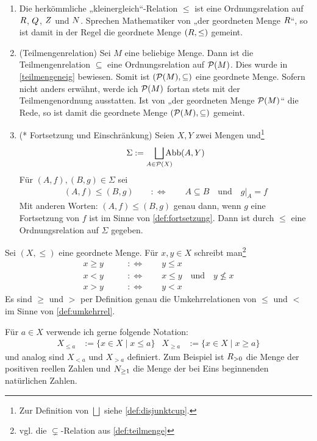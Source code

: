 \begin{bsp} \quad
    \begin{enumerate}
        \item Die herkömmliche „kleinergleich“-Relation $\le$ ist eine Ordnungsrelation auf $\relax R$, $\relax Q$, $\relax Z$ und $\relax N$. Sprechen Mathematiker von „der geordneten Menge $\relax R$“, so ist damit in der Regel die geordnete Menge $(\relax R,\le)$ gemeint.
        \item(Teilmengenrelation) Sei $M$ eine beliebige Menge. Dann ist die Teilmengenrelation $\subseteq$ eine Ordnungsrelation auf $\mathcal P(M)$. Dies wurde in \cref{teilmengeneig} bewiesen. Somit ist $(\mathcal P(M),\subseteq)$ eine geordnete Menge. Sofern nicht anders erwähnt, werde ich $\mathcal P(M)$ fortan stets mit der Teilmengenordnung ausstatten. Ist von „der geordneten Menge $\mathcal P(M)$“ die Rede, so ist damit die geordnete Menge $(\mathcal P(M),\subseteq)$ gemeint.
        \item(* Fortsetzung und Einschränkung) Seien $X,Y$ zwei Mengen und\footnote{Zur Definition von $\bigsqcup$ siehe \cref{def:disjunktcup}.}
            \[ \Sigma := \smashoperator[r]{\bigsqcup_{A\in \calP(X)}} \Abb(A,Y) \]
        Für $(A,f),(B,g)\in\Sigma$ sei
        \begin{align*}
            (A,f) \le (B,g) \qquad:\Leftrightarrow\qquad A\subseteq B\quad \text{und}\quad g\vert_A=f
        \end{align*}
        Mit anderen Worten: $(A,f)\le (B,g)$ genau dann, wenn $g$ eine Fortsetzung von $f$ ist im Sinne von \cref{def:fortsetzung}. Dann ist durch $\le$ eine Ordnungsrelation auf $\Sigma$ gegeben.
    \end{enumerate}
\end{bsp}


\begin{nota} \label{striktkleiner}
    Sei $(X,\le)$ eine geordnete Menge. Für $x,y\in X$ schreibt man\footnote{vgl. die $\subsetneq$-Relation aus \cref{def:teilmenge}}
    \begin{align*}
        x \ge y \qquad &:\Leftrightarrow\qquad y \le x \\
        x < y \qquad &:\Leftrightarrow\qquad x\le y\quad \text{und}\quad y \not \le x \\
        x > y \qquad &:\Leftrightarrow\qquad y < x
    \end{align*}
    Es sind $\ge$ und $>$ per Definition genau die Umkehrrelationen von $\le$ und $<$ im Sinne von \cref{def:umkehrrel}.

    Für $a\in X$ verwende ich gerne folgende Notation:
    \begin{align*}
        X_{\le a} & := \{x\in X\mid x\le a\} & X_{\ge a} & := \{x\in X\mid x\ge a\}
    \end{align*}
    und analog sind $X_{<a}$ und $X_{>a}$ definiert. Zum Beispiel ist $\relax R_{>0}$ die Menge der positiven reellen Zahlen und $\relax N_{\ge 1}$ die Menge der bei Eins beginnenden natürlichen Zahlen.
\end{nota}


